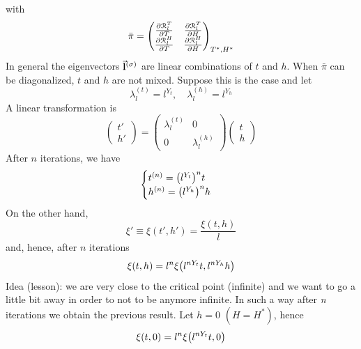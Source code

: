 \documentclass[../main/main.tex]{subfiles}
\begin{document}
with
\begin{equation}
  \bar{\pi } =
  \begin{pmatrix}
     \pdv{\mathcal{R}_l^T}{T} & \pdv{\mathcal{R}_l^T}{H} \\
     \pdv{\mathcal{R}_l^H}{T} & \pdv{\mathcal{R}_l^H}{H}
  \end{pmatrix}_{T^*,H^*}
\end{equation}
In general the eigenvectors \( \va{l}^{(\sigma )} \) are linear combinations of \( t \) and \( h \). When \( \bar{\pi }  \) can be diagonalized, \( t \) and \( h \) are not mixed. Suppose this is the case and let
\begin{equation}
  \lambda _l ^{(t)} = l^{Y_t}, \quad \lambda _l^{(h)} = l ^{Y_h}
\end{equation}
A linear transformation is
\begin{equation}
  \begin{pmatrix}
  t' \\
  h'
  \end{pmatrix}
  =
  \begin{pmatrix}
  \lambda _l^{(t)}   & 0 \\
    0 & \lambda _l^{(h)}
  \end{pmatrix}
  \begin{pmatrix}
  t \\
  h
  \end{pmatrix}
\end{equation}
After \( n \) iterations, we have
\begin{equation}
  \begin{cases}
   t^{(n)} = \qty(l^{Y_t})^n t  \\
  h^{(n)} = \qty(l^{Y_h})^n h
  \end{cases}
\end{equation}
On the other hand,
\begin{equation}
  \xi ' \equiv \xi (t',h') = \frac{\xi (t,h)}{l}
\end{equation}
and, hence, after \( n \) iterations
\begin{equation}
  \xi (t,h) = l^n \xi \qty(l^{n Y_t} t, l^{n Y_h} h)
\end{equation}
Idea (lesson): we are very close to the critical point (infinite) and we want to go a little bit away in order to not to be anymore infinite. In such a way after \emph{n} iterations we obtain the previous result. 
Let \( h=0 \) \( (H=H^*) \), hence
\begin{equation}
  \xi (t,0) = l^n \xi \qty(l^{n Y_t} t , 0)
\end{equation}
\end{document}
